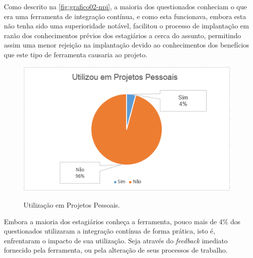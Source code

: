 Como descrito na \autoref{fig:grafico02-npi}, a maioria dos questionados conheciam o que era uma ferramenta de integração contínua, e como esta funcionava, embora esta não tenha sido uma superioridade notável, facilitou o processo de implantação em razão dos conhecimentos prévios dos estagiários a cerca do assunto, permitindo assim uma menor rejeição na implantação devido ao conhecimentos dos benefícios que este tipo de ferramenta causaria ao projeto.

\begin{figure}[H]
\centering
\caption[Utilização em Projetos Pessoais]{Utilização em Projetos Pessoais.}\includegraphics[scale=0.9]{./images/grafico-ci03}
\label{fig:grafico03-npi}
\end{figure}

Embora a maioria dos estagiários conheça a ferramenta, pouco mais de 4\% dos questionados utilizaram a integração contínua de forma prática, isto é, enfrentaram o impacto de sua utilização. Seja através do \textit{feedback} imediato fornecido pela ferramenta, ou pela alteração de seus processos de trabalho.	

